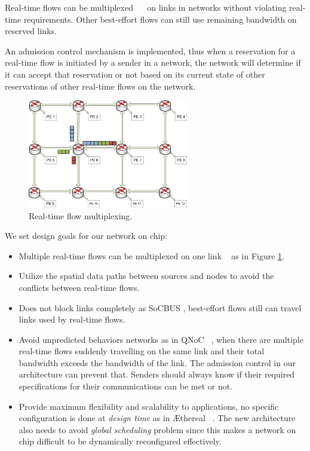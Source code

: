 \documentclass[conference, twocolumn]{IEEEtran}
\theoremstyle{definition}
\begin{document}
Real-time flows can be multiplexed ~\cite{Ferrari90ascheme}~\cite{ZhangService}
on links in networks without violating real-time requirements. Other best-effort
flows can still use remaining bandwidth on reserved links.

An admission control mechanism is implemented, thus when a reservation 
for a real-time flow is initiated by a sender in a network, the network will determine if 
it can accept that reservation or not based on its current state of other 
reservations of other real-time flows on the network.

\begin{figure}[htbp]
\centering
\includegraphics[width=7cm]{pics/Multiplex2}
\caption[Real time flow multiplexing.]
{Real-time flow multiplexing.}\label{fig:FlowMultiplex}
\end{figure}

We set design goals for our network on chip:
\begin{itemize}
\item Multiple real-time flows can be multiplexed on one link
~\cite{Ferrari90ascheme} as in Figure \ref{fig:FlowMultiplex}.
\item Utilize the spatial data paths between sources and nodes to avoid the 
conflicts between real-time flows.
\item Does not block links completely as SoCBUS \cite{SoCBUS}, best-effort flows 
still can travel links used by real-time flows.
\item Avoid unpredicted behaviors networks as in QNoC ~\cite{QNoC}, when there
are multiple real-time flows suddenly travelling on the same link and their total bandwidth 
exceeds the bandwidth of the link. The admission control in our architecture can 
prevent that. Senders should always know if their required specifications for 
their communications can be met or not. 
\item Provide maximum flexibility and scalability to applications, no specific
configuration is done at {\em design time} as in \AE thereal ~\cite{Moonen07SPRINGER}. The
new architecture also needs to avoid {\em global scheduling} problem since this
makes a network on chip difficult to be dynamically reconfigured effectively.
\end{itemize}
\end{document}
